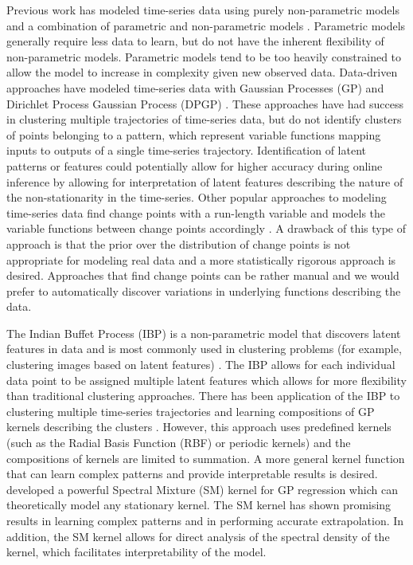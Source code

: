 \documentclass{article}
\begin{document}
Previous work has modeled time-series data using purely non-parametric models \cite{FastNonP} and a combination of parametric and non-parametric models \cite{StructDiscNonPara}. Parametric models generally require less data to learn, but do not have the inherent flexibility of non-parametric models. Parametric models tend to be too heavily constrained to allow the model to increase in complexity given new observed data. Data-driven approaches have modeled time-series data with Gaussian Processes (GP) and Dirichlet Process Gaussian Process (DPGP) \cite{DPGPwithConstraints}. These approaches have had success in clustering multiple trajectories of time-series data, but do not identify clusters of points belonging to a pattern, which represent variable functions mapping inputs to outputs of a single time-series trajectory. Identification of latent patterns or features could potentially allow for higher accuracy during online inference by allowing for interpretation of latent features describing the nature of the non-stationarity in the time-series. Other popular approaches to modeling time-series data find change points with a run-length variable and models the variable functions between change points accordingly \cite{GPChangePointModels}. A drawback of this type of approach is that the prior over the distribution of change points is not appropriate for modeling real data and a more statistically rigorous approach is desired. Approaches that find change points can be rather manual and we would prefer to automatically discover variations in underlying functions describing the data.

The Indian Buffet Process (IBP) is a non-parametric model that discovers latent features in data and is most commonly used in clustering problems (for example, clustering images based on latent features) \cite{IBPshort}. The IBP allows for each individual data point to be assigned multiple latent features which allows for more flexibility than traditional clustering approaches. There has been application of the IBP to clustering multiple time-series trajectories and learning compositions of GP kernels describing the clusters \cite{IBPGP}. However, this approach uses predefined kernels (such as the Radial Basis Function (RBF) or periodic kernels) and the compositions of kernels are limited to summation. A more general kernel function that can learn complex patterns and provide interpretable results is desired. \cite{SMK} developed a powerful Spectral Mixture (SM) kernel for GP regression which can theoretically model any stationary kernel. The SM kernel has shown promising results in learning complex patterns and in performing accurate extrapolation. In addition, the SM kernel allows for direct analysis of the spectral density of the kernel, which facilitates interpretability of the model.
\end{document}

